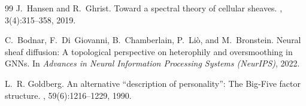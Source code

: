 \documentclass[11pt]{article}
\begin{document}
\begin{thebibliography}{99}
J.~Hansen and R.~Ghrist.
\newblock Toward a spectral theory of cellular sheaves.
, 3(4):315--358, 2019.

C.~Bodnar, F.~Di~Giovanni, B.~Chamberlain, P.~Li\`{o}, and M.~Bronstein.
\newblock Neural sheaf diffusion: A topological perspective on heterophily and oversmoothing in GNNs.
\newblock In {\em Advances in Neural Information Processing Systems (NeurIPS)}, 2022.

L.~R. Goldberg.
\newblock An alternative ``description of personality'': The Big-Five factor structure.
, 59(6):1216--1229, 1990.

\end{thebibliography}
\end{document}
